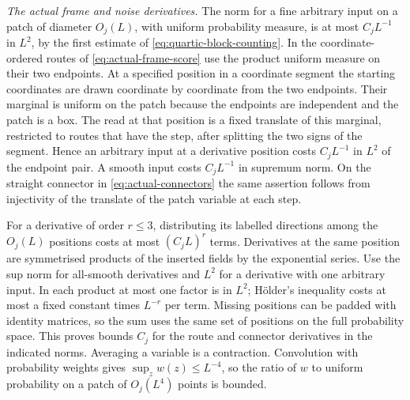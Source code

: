 \documentclass[11pt,reqno]{amsart}
\numberwithin{equation}{section}
\theoremstyle{definition}
\theoremstyle{remark}
\begin{document}
\smallskip\noindent
\emph{The actual frame and noise derivatives.}
The norm for a fine arbitrary input on a patch of diameter
\(O_j(L)\), with uniform probability measure, is at most
\(C_jL^{-1}\) in \(L^2\), by the first estimate of
\eqref{eq:quartic-block-counting}. In the coordinate-ordered
routes of \eqref{eq:actual-frame-score} use the product
uniform measure on their two endpoints. At a specified
position in a coordinate segment the starting coordinates
are drawn coordinate by coordinate from the two endpoints.
Their marginal is uniform on the patch because the endpoints
are independent and the patch is a box. The read at that
position is a fixed translate of this marginal, restricted
to routes that have the step, after splitting the two signs
of the segment. Hence an arbitrary input at a derivative
position costs \(C_jL^{-1}\) in \(L^2\) of the endpoint pair.
A smooth input costs \(C_jL^{-1}\) in supremum norm. On
the straight connector in \eqref{eq:actual-connectors} the
same assertion follows from injectivity of the translate of
the patch variable at each step.

For a derivative of order \(r\le3\), distributing its
labelled directions among the \(O_j(L)\) positions costs
at most \((C_jL)^r\) terms. Derivatives at the same position
are symmetrised products of the inserted fields by the
exponential series. Use the sup norm for all-smooth
derivatives and \(L^2\) for a derivative with one arbitrary
input. In each product at most one factor is in \(L^2\);
H\"older's inequality costs at most a fixed constant times
\(L^{-r}\) per term. Missing positions can be padded with
identity matrices, so the sum uses the same set of positions
on the full probability space. This proves bounds \(C_j\)
for the route and connector derivatives in the indicated
norms. Averaging a variable is a contraction. Convolution
with probability weights gives \(\sup_z w(z)\le L^{-4}\),
so the ratio of \(w\) to uniform probability on a patch of
\(O_j(L^4)\) points is bounded.
\end{document}

